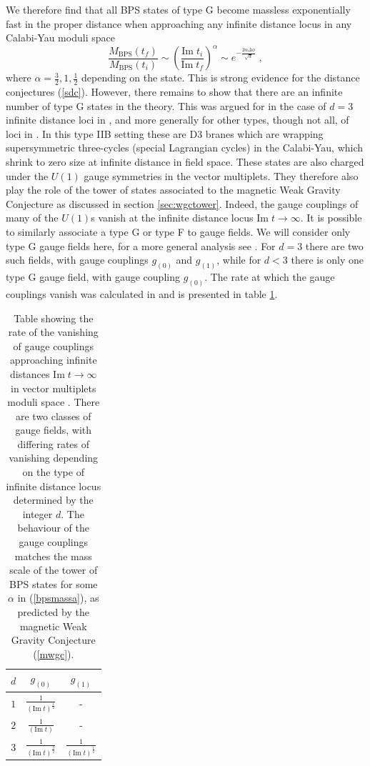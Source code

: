 \documentclass[11pt,a4paper]{article}
\numberwithin{equation}{section}
\numberwithin{table}{section}\setlength{\multlinegap}{25pt}
\newcommand{\be}{\begin{equation}}
\newcommand{\ee}{\end{equation}}
\begin{document}
We therefore find that all BPS states of type G become massless exponentially fast in the proper distance when approaching any infinite distance locus in any Calabi-Yau moduli space
\be
\frac{M_{\mathrm{BPS}}\left(t_f\right)}{M_{\mathrm{BPS}}\left(t_i\right)} \sim \left(\frac{\mathrm{Im\;} t_i}{\mathrm{Im\;} t_f }\right)^{\alpha} \sim e^{-\frac{2 \alpha\Delta \phi}{\sqrt{d}}} \;,
\label{bpsmassa}
\ee
where $\alpha = \frac32, 1, \frac12$ depending on the state.
This is strong evidence for the distance conjectures (\ref{sdc}). However, there remains to show that there are an infinite number of type G states in the theory. This was argued for in the case of $d=3$ infinite distance loci in \cite{Grimm:2018ohb}, and more generally for other types, though not all, of loci in \cite{Grimm:2018cpv}. In this type IIB setting these are D3 branes which are wrapping supersymmetric three-cycles (special Lagrangian cycles) in the Calabi-Yau, which shrink to zero size at infinite distance in field space. These states are also charged under the $U(1)$ gauge symmetries in the vector multiplets. They therefore also play the role of the tower of states associated to the magnetic Weak Gravity Conjecture as discussed in section \ref{sec:wgctower}. Indeed, the gauge couplings of many of the $U(1)$s vanish at the infinite distance locus $\mathrm{Im\;}t \rightarrow \infty$. It is possible to similarly associate a type G or type F to gauge fields. We will consider only type G gauge fields here, for a more general analysis see \cite{Grimm:2018ohb}. For $d=3$ there are two such fields, with gauge couplings $g_{(0)}$ and $g_{(1)}$, while for $d<3$ there is only one type G gauge field, with gauge coupling $g_{(0)}$. The rate at which the gauge couplings vanish was calculated in \cite{Grimm:2018ohb} and is presented in table \ref{tab:gauvan}.
\begin{table}
\center
\begin{tabular}{| c | c | c |}
\hline
$d$  & $g_{(0)}$ & $g_{(1)}$  \\
\hline
 \rule[-.3cm]{0cm}{0.8cm} $1$ & $\frac{1}{\left(\mathrm{Im\;} t\right)^{\frac12}}$ &  - \\
\hline
 \rule[-.3cm]{0cm}{0.8cm} $2$ &$\frac{1}{\left(\mathrm{Im\;} t\right)}$  &  - \\
\hline
 \rule[-.3cm]{0cm}{0.8cm} $3$ & $\frac{1}{\left(\mathrm{Im\;} t\right)^{\frac32}}$ &  $\frac{1}{\left(\mathrm{Im\;} t\right)^{\frac12}}$  \\
\hline
\end{tabular}
\caption{Table showing the rate of the vanishing of gauge couplings approaching infinite distances $\mathrm{Im\;}t \rightarrow \infty$ in vector multiplets moduli space . There are two classes of gauge fields, with differing rates of vanishing depending on the type of infinite distance locus determined by the integer $d$. The behaviour of the gauge couplings matches the mass scale of the tower of BPS states for some $\alpha$ in (\ref{bpsmassa}), as predicted by the magnetic Weak Gravity Conjecture (\ref{mwgc}).}
\label{tab:gauvan}
\end{table}
\end{document}
